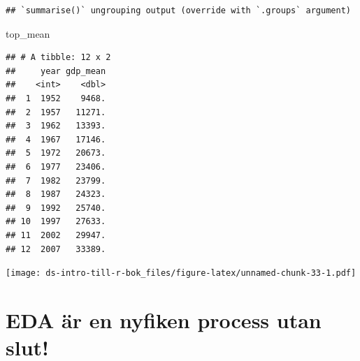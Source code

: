 \documentclass[
]{book}
\newenvironment{Shaded}{\begin{snugshade}}{\end{snugshade}}
\newcommand{\AttributeTok}[1]{\textcolor[rgb]{0.77,0.63,0.00}{#1}}
\newcommand{\FunctionTok}[1]{\textcolor[rgb]{0.00,0.00,0.00}{#1}}
\newcommand{\NormalTok}[1]{#1}
\newcommand{\OtherTok}[1]{\textcolor[rgb]{0.56,0.35,0.01}{#1}}
\newcommand{\SpecialCharTok}[1]{\textcolor[rgb]{0.00,0.00,0.00}{#1}}
\newcommand{\StringTok}[1]{\textcolor[rgb]{0.31,0.60,0.02}{#1}}
\begin{document}
\begin{verbatim}
## `summarise()` ungrouping output (override with `.groups` argument)
\end{verbatim}

\begin{Shaded}
\begin{Highlighting}[]
\NormalTok{top\_mean}
\end{Highlighting}
\end{Shaded}

\begin{verbatim}
## # A tibble: 12 x 2
##     year gdp_mean
##    <int>    <dbl>
##  1  1952    9468.
##  2  1957   11271.
##  3  1962   13393.
##  4  1967   17146.
##  5  1972   20673.
##  6  1977   23406.
##  7  1982   23799.
##  8  1987   24323.
##  9  1992   25740.
## 10  1997   27633.
## 11  2002   29947.
## 12  2007   33389.
\end{verbatim}

\begin{Shaded}
\end{Shaded}

\texttt{[image: ds-intro-till-r-bok\_files/figure-latex/unnamed-chunk-33-1.pdf]}

\hypertarget{eda-uxe4r-en-nyfiken-process-utan-slut}{%
\section{EDA är en nyfiken process utan slut!}\label{eda-uxe4r-en-nyfiken-process-utan-slut}}
\end{document}
